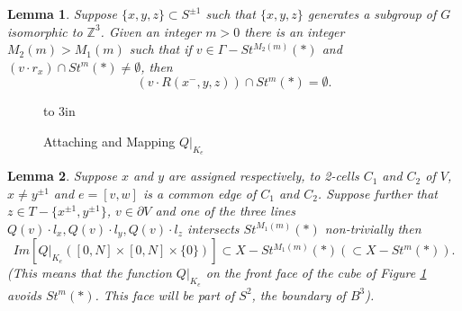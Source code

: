 \documentclass[10pt,a4paper]{amsart}
\newtheorem{lemma}{Lemma}
\begin{document}
\begin{lemma}\label{L3}
Suppose $\{x,y,z\}\subset S^{\pm1}$ such that $\{x,y,z\}$ generates a subgroup of $G$ isomorphic to $\mathbb Z^3$. Given an integer $m>0$ there is an integer $M_2(m)>M_1(m)$ such that if  $v\in \Gamma-St^{M_2(m)}(\ast)$ and 
$(v\cdot r_x)\cap St^m(\ast)\ne\emptyset$, then  
$$(v\cdot R(x^-,y,z))\cap St^m(\ast)=\emptyset.$$ 
\end{lemma}

\begin{figure}
\vbox to 3in{\vspace {-1in} \hspace {-.1in}
\hspace{-1 in}

\vss }
\vspace{.2in}
\caption{Attaching and Mapping $Q|_{K_e}$} 
\label{Fig2}
\vspace{-.1in}
\end{figure}

\begin{lemma}\label{L8}
Suppose $x$ and $y$ are assigned respectively, to 2-cells $C_1$ and $C_2$ of $V$,  $x\ne y^{\pm1}$ and  $e=[v,w]$ is a common edge of $C_1$ and $C_2$. Suppose further that $z\in T-\{x^{\pm 1},y^{\pm 1}\}$, $v\in \partial V$ and one of the  three lines $Q(v)\cdot l_x, Q(v)\cdot l_y, Q(v)\cdot l_z$ intersects $St^{M_1(m)}(\ast)$ non-trivially then
$$Im[Q|_{K_e}([0,N]\times [0,N]\times\{0\})]\subset X-St^{M_1(m)}(\ast)(\subset X-St^m(\ast)).$$ 
(This means that the function $Q|_{K_e}$ on the front face of the cube of Figure \ref{Fig2} avoids $St^m(\ast)$. This face will be part of $S^2$, the boundary of $B^3$). 
\end{lemma}
\end{document}
